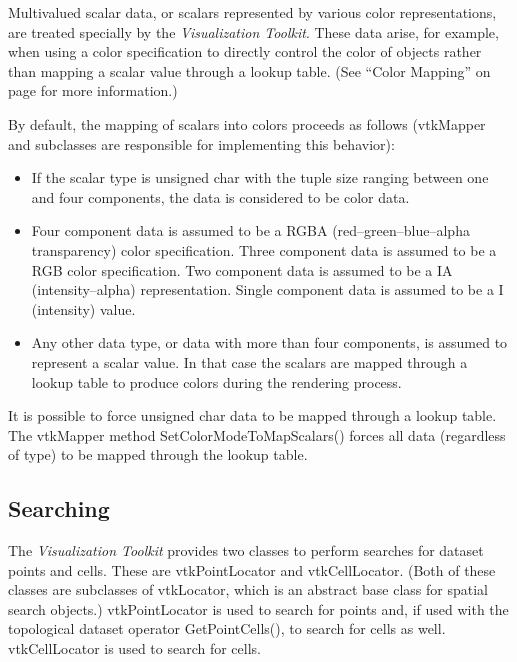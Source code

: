 Multivalued scalar data, or scalars represented by various color representations, are treated specially by the \emph{Visualization Toolkit}. These data arise, for example, when using a color specification to directly control the color of objects rather than mapping a scalar value through a lookup table. (See ``Color Mapping'' on page \pageref{subsec:color_mapping} for more information.)

By default, the mapping of scalars into colors proceeds as follows (vtkMapper and subclasses are responsible for implementing this behavior):
\begin{itemize}

\item If the scalar type is unsigned char with the tuple size ranging between one and four components, the data is considered to be color data.

\item Four component data is assumed to be a RGBA (red--green--blue--alpha transparency) color specification. Three component data is assumed to be a RGB color specification. Two component data is assumed to be a IA (intensity--alpha) representation. Single component data is assumed to be a I (intensity) value.

\item Any other data type, or data with more than four components, is assumed to represent a scalar value. In that case the scalars are mapped through a lookup table to produce colors during the rendering process.

\end{itemize}

It is possible to force unsigned char data to be mapped through a lookup table. The vtkMapper method SetColorModeToMapScalars() forces all data  (regardless of type) to be mapped through the lookup table.

\subsection{Searching}

The \emph{Visualization Toolkit} provides two classes to perform searches for dataset points and cells. These are vtkPointLocator and vtkCellLocator. (Both of these classes are subclasses of vtkLocator, which is an abstract base class for spatial search objects.) vtkPointLocator is used to search for points and, if used with the topological dataset operator GetPointCells(), to search for cells as well. vtkCellLocator is used to search for cells.

